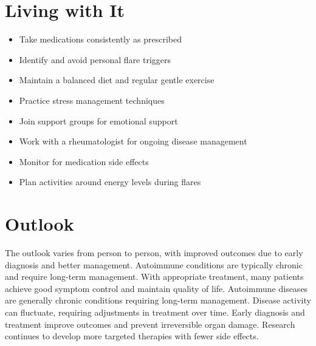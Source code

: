 \section{Living with It}
\begin{itemize}[noitemsep]
  \item Take medications consistently as prescribed
  \item Identify and avoid personal flare triggers
  \item Maintain a balanced diet and regular gentle exercise
  \item Practice stress management techniques
  \item Join support groups for emotional support
  \item Work with a rheumatologist for ongoing disease management
  \item Monitor for medication side effects
  \item Plan activities around energy levels during flares
\end{itemize}
\section{Outlook}
The outlook varies from person to person, with improved outcomes due to early diagnosis and better management. Autoimmune conditions are typically chronic and require long-term management. With appropriate treatment, many patients achieve good symptom control and maintain quality of life. Autoimmune diseases are generally chronic conditions requiring long-term management. Disease activity can fluctuate, requiring adjustments in treatment over time. Early diagnosis and treatment improve outcomes and prevent irreversible organ damage. Research continues to develop more targeted therapies with fewer side effects.
